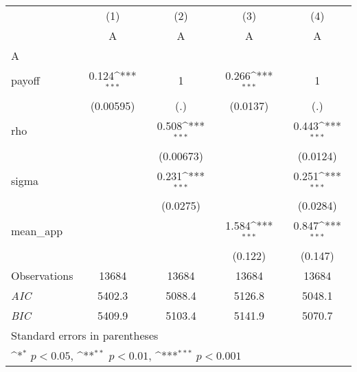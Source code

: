 {
\def\sym#1{\ifmmode^{#1}\else\(^{#1}\)\fi}
\begin{tabular}{l*{4}{c}}
\hline\hline
                    &\multicolumn{1}{c}{(1)}&\multicolumn{1}{c}{(2)}&\multicolumn{1}{c}{(3)}&\multicolumn{1}{c}{(4)}\\
                    &\multicolumn{1}{c}{A}&\multicolumn{1}{c}{A}&\multicolumn{1}{c}{A}&\multicolumn{1}{c}{A}\\
\hline
A                   &                     &                     &                     &                     \\
payoff              &       0.124\sym{***}&           1         &       0.266\sym{***}&           1         \\
                    &   (0.00595)         &         (.)         &    (0.0137)         &         (.)         \\
[1em]
rho                 &                     &       0.508\sym{***}&                     &       0.443\sym{***}\\
                    &                     &   (0.00673)         &                     &    (0.0124)         \\
[1em]
sigma               &                     &       0.231\sym{***}&                     &       0.251\sym{***}\\
                    &                     &    (0.0275)         &                     &    (0.0284)         \\
[1em]
mean\_app            &                     &                     &       1.584\sym{***}&       0.847\sym{***}\\
                    &                     &                     &     (0.122)         &     (0.147)         \\
\hline
Observations        &       13684         &       13684         &       13684         &       13684         \\
\textit{AIC}        &      5402.3         &      5088.4         &      5126.8         &      5048.1         \\
\textit{BIC}        &      5409.9         &      5103.4         &      5141.9         &      5070.7         \\
\hline\hline
\multicolumn{5}{l}{\footnotesize Standard errors in parentheses}\\
\multicolumn{5}{l}{\footnotesize \sym{*} \(p<0.05\), \sym{**} \(p<0.01\), \sym{***} \(p<0.001\)}\\
\end{tabular}
}
